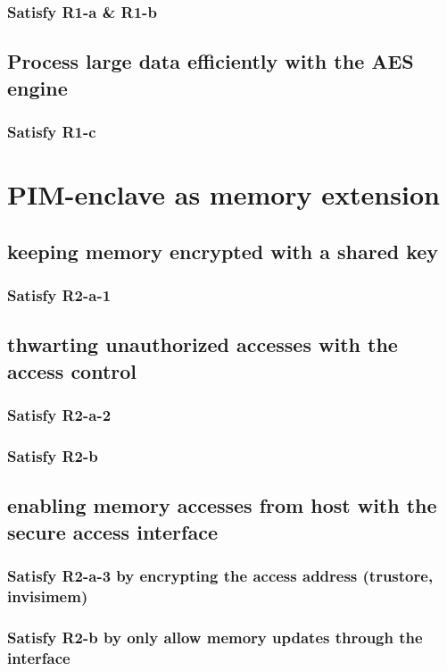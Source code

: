 \documentclass[11pt]{article}
\begin{document}
\subsubsection{Satisfy R1-a \& R1-b}
\label{sec:orgf6a80ea}
\subsection{Process large data efficiently with the AES engine}
\label{sec:org3dfe836}
\subsubsection{Satisfy R1-c}
\label{sec:orga71afa2}
\section{PIM-enclave as memory extension}
\label{sec:org5a2f2dc}
\subsection{keeping memory encrypted with a shared key}
\label{sec:org21e3310}
\subsubsection{Satisfy R2-a-1}
\label{sec:org23ab08b}
\subsection{thwarting unauthorized accesses with the access control}
\label{sec:org8b13cd0}
\subsubsection{Satisfy R2-a-2}
\label{sec:org9c1d058}
\subsubsection{Satisfy R2-b}
\label{sec:orgc40be8b}
\subsection{enabling memory accesses from host with the secure access interface}
\label{sec:org34d866e}
\subsubsection{Satisfy R2-a-3 by encrypting the access address (trustore, invisimem)}
\label{sec:orgee9eaa7}
\subsubsection{Satisfy R2-b by only allow memory updates through the interface}
\label{sec:orgd17e28e}
\end{document}
